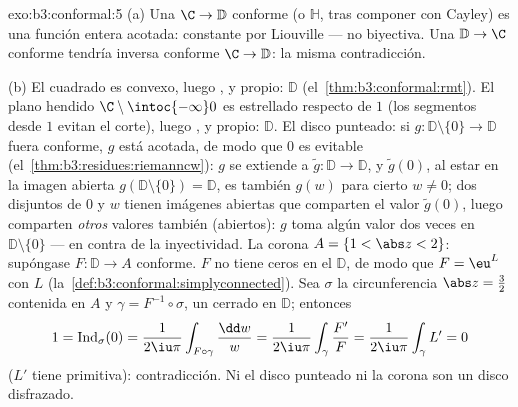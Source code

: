 \begin{solution}{exo:b3:conformal:5}
(a) Una $\C \to \mathbb D$ conforme (o $\mathbb H$, tras componer con
Cayley) es una función entera acotada: constante por Liouville --- no
biyectiva. Una $\mathbb
D \to \C$ conforme tendría inversa conforme $\C \to \mathbb D$: la misma
contradicción.

(b) El cuadrado es convexo, luego
, y propio:
 $\mathbb D$
(el~\cref{thm:b3:conformal:rmt}). El plano hendido
$\C\setminus\intoc{-\infty}0$ es estrellado respecto de $1$ (los
segmentos desde $1$ evitan el corte), luego
, y propio:
 $\mathbb D$. El disco
punteado: si $g \colon \mathbb D\setminus\{0\} \to \mathbb D$ fuera
conforme, $g$ está acotada, de modo que $0$ es evitable
(el~\cref{thm:b3:residues:riemanncw}): $g$ se extiende a $\tilde g
\colon \mathbb D \to \mathbb D$, y $\tilde g(0)$, al estar en la imagen
abierta $g(\mathbb D\setminus\{0\}) = \mathbb D$, es también $g(w)$ para
cierto $w \neq 0$; dos 
disjuntos de $0$ y $w$ tienen imágenes abiertas que comparten el valor
$\tilde g(0)$, luego comparten \emph{otros} valores también
(abiertos): $g$ toma algún valor dos
veces en $\mathbb D\setminus\{0\}$ --- en contra de la inyectividad. La
corona $A = \{1 < \abs z < 2\}$: supóngase $F \colon \mathbb D
\to A$ conforme. $F$ no tiene ceros en el
$\mathbb D$, de modo que $F = \eu^L$ con $L$
(la~\cref{def:b3:conformal:simplyconnected}). Sea $\sigma$ la
circunferencia $\abs z = \frac32$ contenida en $A$ y $\gamma =
F^{-1}\circ\sigma$, un 
cerrado en $\mathbb D$; entonces
\[
1 = \operatorname{Ind}_\sigma(0)
= \frac1{2\iu\pi}\int_{F\circ\gamma}\frac{\dd w}{w}
= \frac1{2\iu\pi}\int_\gamma\frac{F'}{F}
= \frac1{2\iu\pi}\int_\gamma L' = 0
\]
($L'$ tiene primitiva): contradicción. Ni el disco punteado ni la corona
son un disco disfrazado.
\end{solution}

